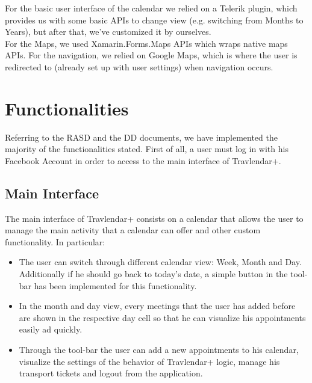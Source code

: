 For the basic user interface of the calendar we relied on a Telerik plugin, which provides us with some basic APIs to change view (e.g. switching from Months to Years), but after that, we've customized it by ourselves. \\

For the Maps, we used Xamarin.Forms.Maps APIs which wraps native maps APIs. For the navigation, we relied on Google Maps, which is where the user is redirected to (already set up with user settings) when navigation occurs.

\section{Functionalities}
Referring to the RASD and the DD documents, we have implemented the majority of the functionalities stated.
First of all, a user must log in with his Facebook Account in order to access to the main interface of Travlendar+.

\subsection*{Main Interface}
The main interface of Travlendar+ consists on a calendar that allows the user to manage the main activity that a calendar can offer and other custom functionality. In particular:
\begin{itemize}
\item The user can switch through different calendar view: Week, Month and Day. Additionally if he should go back to today's date, a simple button in the tool-bar has been implemented for this functionality.
\item In the month and day view, every meetings that the user has added before are shown in the respective day cell so that he can visualize his appointments easily ad quickly. 
\item Through the tool-bar the user can add a new appointments to his calendar, visualize the settings of the behavior of Travlendar+ logic, manage his transport tickets and logout from the application. 
\end{itemize}

